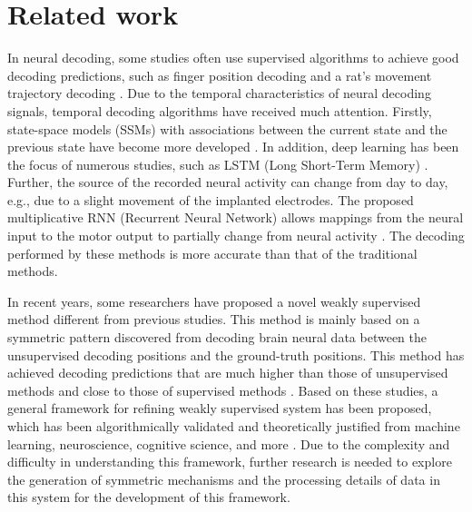 \section{Related work}
In neural decoding, some studies often use supervised algorithms to achieve good decoding predictions, such as finger position decoding \cite{wallisch2014matlab,wu2019neural} and a rat's movement trajectory decoding \cite{Glaser2020machine}. Due to the temporal characteristics of neural decoding signals, temporal decoding algorithms have received much attention. Firstly, state-space models (SSMs) with associations between the current state and the previous state have become more developed \cite{gilja2012a,wallisch2014matlab,wu2019neural}. 
In addition, deep learning has been the focus of numerous studies, such as LSTM (Long Short-Term Memory) \cite{elango2016sequence,pan2018rapid}. Further, the source of the recorded neural activity can change from day to day, e.g., due to a slight movement of the implanted electrodes. The proposed multiplicative RNN (Recurrent Neural Network) allows mappings from the neural input to the motor output to partially change from neural activity \cite{sussillo2018making}. The decoding performed by these methods is more accurate than that of the traditional methods. 

In recent years, some researchers have proposed a novel weakly supervised method different from previous studies. This method is mainly based on a symmetric pattern discovered from decoding brain neural data between the unsupervised decoding positions and the ground-truth positions. This method has achieved decoding predictions that are much higher than those of unsupervised methods and close to those of supervised methods \cite{feng2018neural,feng2020weakly}. Based on these studies, a general framework for refining weakly supervised system has been proposed, which has been algorithmically validated \cite{feng2021vif} and theoretically justified from machine learning, neuroscience, cognitive science, and more \cite{feng2023grid}. Due to the complexity and difficulty in understanding this framework, further research is needed to explore the generation of symmetric mechanisms and the processing details of data in this system for the development of this framework.
